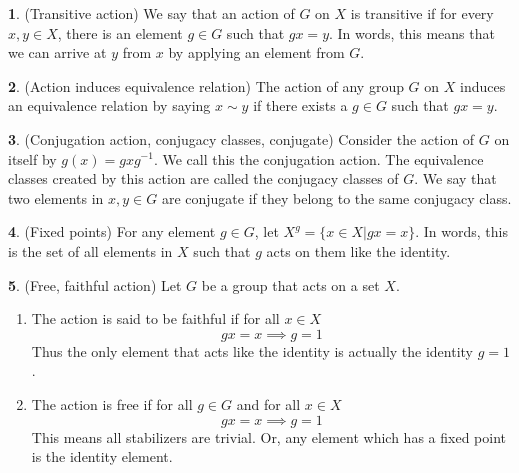 \documentclass[12pt]{article}
\theoremstyle{definition}
\newtheorem{definition}{\color{NavyBlue}{\textbf{Definition}}}
\begin{document}
\begin{definition}(Transitive action)
We say that an action of $G$ on $X$ is transitive if for every $x,y \in X$, there is an element $g \in G$ such that $gx = y$. In words, this means that we can arrive at $y$ from $x$ by applying an element from $G$.
\end{definition}

\begin{definition}(Action induces equivalence relation)
The action of any group $G$ on $X$ induces an equivalence relation by saying $x \sim y$ if there exists a $g \in G$ such that $gx = y$.
\end{definition}

\begin{definition}(Conjugation action, conjugacy classes, conjugate)
Consider the action of $G$ on itself by $g(x) = gxg^{-1}$. We call this the conjugation action. The equivalence classes created by this action are called the conjugacy classes of $G$. We say that two elements in $x,y\in G$ are conjugate if they belong to the same conjugacy class.
\end{definition}

\begin{definition}(Fixed points)
For any element $g\in G$, let $X^g = \{x\in X|gx = x\}$. In words, this is the set of all elements in $X$ such that $g$ acts on them like the identity.
\end{definition}

\begin{definition}(Free, faithful action)
Let $G$ be a group that acts on a set $X$.
\begin{enumerate}
\item The action is said to be faithful if for all $x \in X$
\begin{equation}
gx = x \implies g = 1
\end{equation}
Thus the only element that acts like the identity is actually the identity $g=1$.
\item The action is free if for all $g\in G$ and for all $x \in X$
\begin{equation}
gx = x \implies g = 1
\end{equation}
This means all stabilizers are trivial. Or, any element which has a fixed point is the identity element.
\end{enumerate}
\end{definition}
\end{document}

